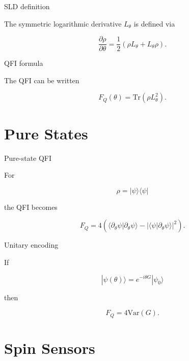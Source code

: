 \documentclass[aspectratio=169]{beamer}
\begin{document}
\begin{frame}{SLD definition}

The symmetric logarithmic derivative $L_\theta$ is defined via

\begin{equation}
\frac{\partial \rho}{\partial \theta}
=
\frac12 (\rho L_\theta + L_\theta \rho).
\end{equation}
\end{frame}

\begin{frame}{QFI formula}

The QFI can be written

\begin{equation}
F_Q(\theta)
=
\mathrm{Tr}(\rho L_\theta^2).
\end{equation}
\end{frame}

\section{Pure States}

\begin{frame}{Pure-state QFI}

For

\begin{equation}
\rho = |\psi\rangle \langle \psi|
\end{equation}

the QFI becomes

\begin{equation}
F_Q =
4\left(
\langle \partial_\theta \psi | \partial_\theta \psi \rangle
-
|\langle \psi | \partial_\theta \psi \rangle|^2
\right).
\end{equation}
\end{frame}

\begin{frame}{Unitary encoding}

If

\begin{equation}
|\psi(\theta)\rangle
=
e^{-i\theta G}|\psi_0\rangle
\end{equation}

then

\begin{equation}
F_Q = 4 \mathrm{Var}(G).
\end{equation}
\end{frame}

\section{Spin Sensors}
\end{document}
